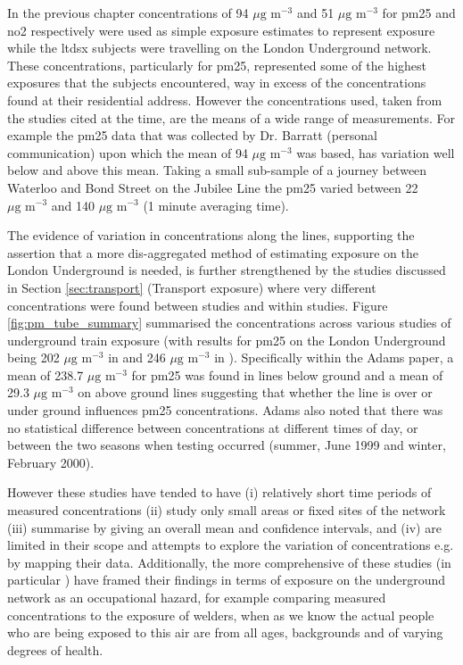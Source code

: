 In the previous chapter concentrations of 94 $\mu \text{g m}^{-3}$ and 51 $\mu \text{g m}^{-3}$ for \gls{pm25} and \gls{no2} respectively were used as simple exposure estimates to represent exposure while the \gls{ltdsx} subjects were travelling on the London Underground network. These concentrations, particularly for \gls{pm25}, represented some of the highest exposures that the subjects encountered, way in excess of the concentrations found at their residential address. However the concentrations used, taken from the studies cited at the time, are the means of a wide range of measurements. For example the \gls{pm25} data that was collected by Dr. Barratt (personal communication) upon which the mean of 94 $\mu \text{g m}^{-3}$ was based, has variation well below and above this mean. Taking a small sub-sample of a journey between Waterloo and Bond Street on the Jubilee Line the \gls{pm25} varied between 22 $\mu \text{g m}^{-3}$ and 140 $\mu \text{g m}^{-3}$ (1 minute averaging time).

The evidence of variation in concentrations along the lines, supporting the assertion that a more dis-aggregated method of estimating exposure on the London Underground is needed, is further strengthened by the studies discussed in Section \ref{sec:transport} (Transport exposure) where very different concentrations were found between studies and within studies. Figure \ref{fig:pm_tube_summary}  summarised the concentrations across various studies of underground train exposure (with results for \gls{pm25} on the London Underground being 202 $\mu \text{g m}^{-3}$ in \cite{Adams2001} and 246 $\mu \text{g m}^{-3}$ in \cite{Pfeifer1999a}). Specifically within the Adams paper, a mean of 238.7 $\mu \text{g m}^{-3}$ for \gls{pm25} was found in lines below ground and a mean of 29.3 $\mu \text{g m}^{-3}$ on above ground lines suggesting that whether the line is over or under ground influences \gls{pm25} concentrations. Adams also noted that there was no statistical difference between concentrations at different times of day, or between the two seasons when testing occurred (summer, June 1999 and winter, February 2000).

However these studies have tended to have (i) relatively short time periods of measured concentrations (ii) study only small areas or fixed sites of the network (iii) summarise by giving an overall mean and confidence intervals, and (iv) are limited in their scope and attempts to explore the variation of concentrations e.g. by mapping their data. Additionally, the more comprehensive of these studies (in particular \cite{Hurley2003}) have framed their findings in terms of exposure on the underground network as an occupational hazard, for example comparing measured concentrations to the exposure of welders, when as we know the actual people who are being exposed to this air are from all ages, backgrounds and of varying degrees of health.

